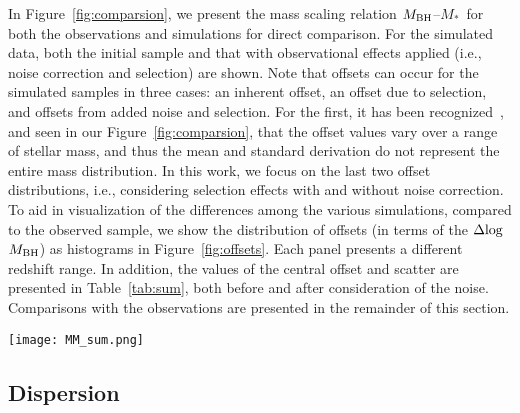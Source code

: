 \documentclass[twocolumn]{aastex631}
\def\smass{{$M_*$}}
\def\mbh{$M_{\rm BH}$}
\begin{document}
In Figure~\ref{fig:comparsion}, we present the mass scaling relation \mbh--\smass\ for both the observations and simulations for direct comparison. For the simulated data, both the initial sample and that with observational effects applied (i.e., noise correction and selection) are shown. Note that offsets can occur for the simulated samples in three cases: an inherent offset, an offset due to selection, and offsets from added noise and selection. For the first, it has been recognized~\citep[e.g.,][Figure 2]{Habouzit2021}, and seen in our Figure~\ref{fig:comparsion}, that the  offset values vary over a range of stellar mass, and thus the mean and standard derivation do not represent the entire mass distribution.
In this work, we focus on the last two offset distributions, i.e., considering selection effects with and without noise correction. To aid in visualization of the differences among the various simulations, compared to the observed sample, we show the distribution of offsets (in terms of the $\Delta{\rm log}$\mbh) as histograms in Figure~\ref{fig:offsets}.  Each panel presents a different redshift range. In addition, the values of the central offset and scatter are presented 
in Table~\ref{tab:sum}, both before and after consideration of the noise. Comparisons with the observations are presented in the remainder of this section.

\begin{figure*}
\centering
\texttt{[image: MM\_sum.png]}
\caption{\label{fig:comparsion} 
BH mass vs. stellar mass for both the observational (small orange circles) and simulated (small colored circles) samples. Each row pertains to a particular simulation as labeled. The panels, from left to right, show different redshift bins. The black line in each panel indicates the local relation adopted by~\citet{Ding2020}. The background cloud (in green and yellow with contours) shows the intrinsic simulation number density before injecting random noise and applying selection effects. The TNG100 and TNG300 appear to present similar results (see discussion section). We note that different samples adopt either a Chabrier or a Salpeter IMF for calculating the stellar mass; thus, the \smass\ values for the observations and the local relation are shifted appropriately.
}
\end{figure*} 

\subsection{Dispersion}
\end{document}
